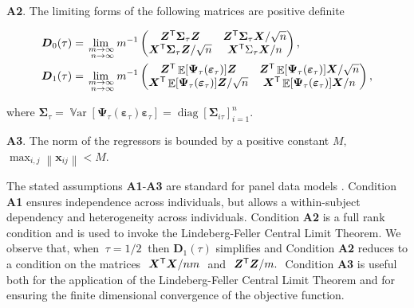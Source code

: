 \documentclass[15pt,a4paper]{article}
\DeclareMathOperator{\Var}{\mathbb{V}\text{ar}}
\DeclareMathOperator{\E}{\mathbb{E}}
\DeclareMathOperator{\diag}{diag}
\newcommand{\norm}[1]{\left\lVert#1\right\rVert}
\newcommand{\transpose}{{}^{\text{\sffamily T}}}
\begin{document}
\textbf{A2}. The limiting forms of the following matrices are positive definite

\begin{align*}
 \boldsymbol{D}_0 (\tau) &=\;\;
 \lim_{\substack{ \mathllap{m} \rightarrow \mathrlap{\infty} \\  \mathllap{n} \rightarrow \mathrlap{\infty} }} \;\;
 m^{-1} 
 \begin{pmatrix}
  \boldsymbol{Z}\transpose\boldsymbol{\Sigma}_{\tau}\boldsymbol{Z} & \boldsymbol{Z}\transpose\boldsymbol{\Sigma}_{\tau}\boldsymbol{X}/\sqrt{n}  \\
  \boldsymbol{X}\transpose\boldsymbol{\Sigma}_{\tau}\boldsymbol{Z}/\sqrt{n}  & \boldsymbol{X}\transpose\Sigma_{\tau}\boldsymbol{X}/n  
 \end{pmatrix},\\
 \boldsymbol{D}_1 (\tau) &=\;\;
  \lim_{\substack{ \mathllap{m} \rightarrow \mathrlap{\infty} \\ 
 \mathllap{n} \rightarrow \mathrlap{\infty} }} \;\;
 m^{-1} 
 \begin{pmatrix}
  \boldsymbol{Z}\transpose\E[\boldsymbol{\Psi}_{\tau}(\boldsymbol{\varepsilon}_{\tau})]\boldsymbol{Z} & \boldsymbol{Z}\transpose\E[\boldsymbol{\Psi}_{\tau}(\boldsymbol{\varepsilon}_{\tau})]\boldsymbol{X}/\sqrt{n}\\
  \boldsymbol{X}\transpose\E[\boldsymbol{\Psi}_{\tau}(\boldsymbol{\varepsilon}_{\tau})]\boldsymbol{Z}/\sqrt{n}  & \boldsymbol{X}\transpose\E[\boldsymbol{\Psi}_{\tau}(\boldsymbol{\varepsilon}_{\tau})]\boldsymbol{X}/n
 \end{pmatrix},
\end{align*}

where \(\boldsymbol{\Sigma}_{\tau}=\Var[\boldsymbol{\Psi}_{\tau}(\boldsymbol{\varepsilon}_{\tau})\boldsymbol{\varepsilon}_{\tau}]=\diag[\boldsymbol{\Sigma}_{i\tau }]_{i=1}^{n}.\)

\textbf{A3}. The norm of the regressors is bounded by a positive constant $M, \ $ \(\max_{i,j} \norm{\boldsymbol{x}_{ij}}< M.\) 

The stated assumptions \textbf{A1}-\textbf{A3} are standard for panel data models \citep{koenker_quantile_2004}. Condition \textbf{A1} ensures independence across individuals, but allows a within-subject dependency and heterogeneity across individuals. Condition \textbf{A2} is a full rank condition and is used to invoke the Lindeberg-Feller Central Limit Theorem. We observe that, when \(\ \tau =1/2\ \) then \(\boldsymbol{D}_1 (\tau)\) simplifies and Condition \textbf{A2} reduces to a condition on the matrices \( \ \boldsymbol{X}\transpose\boldsymbol{X}/nm \ \) and \( \ \boldsymbol{Z}\transpose\boldsymbol{Z}/m.\ \) Condition \textbf{A3} is useful both for the application of the Lindeberg-Feller Central Limit Theorem and for ensuring the finite dimensional convergence of the objective function.
\end{document}
